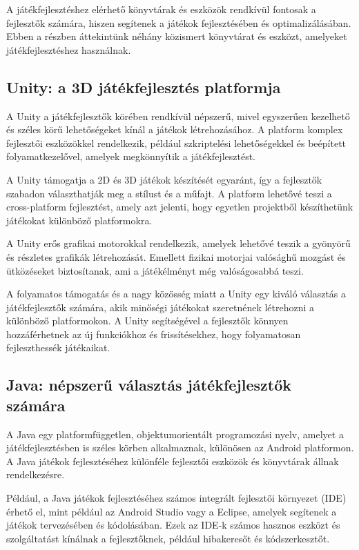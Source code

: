  A játékfejlesztéshez elérhető könyvtárak és eszközök rendkívül fontosak a fejlesztők számára, hiszen segítenek a játékok fejlesztésében és optimalizálásában. Ebben a részben áttekintünk néhány közismert könyvtárat és eszközt, amelyeket játékfejlesztéshez használnak.

\bigskip

\subsection{Unity: a 3D játékfejlesztés platformja}

A Unity\cite{unity-docs, unity-web} a játékfejlesztők körében rendkívül népszerű, mivel egyszerűen kezelhető és széles körű lehetőségeket kínál a játékok létrehozásához. A platform komplex fejlesztői eszközökkel rendelkezik, például szkriptelési lehetőségekkel és beépített folyamatkezelővel, amelyek megkönnyítik a játékfejlesztést. 

A Unity támogatja a 2D és 3D játékok készítését egyaránt, így a fejlesztők szabadon választhatják meg a stílust és a műfajt. A platform lehetővé teszi a cross-platform fejlesztést, amely azt jelenti, hogy egyetlen projektből készíthetünk játékokat különböző platformokra.

A Unity erős grafikai motorokkal rendelkezik, amelyek lehetővé teszik a gyönyörű és részletes grafikák létrehozását. Emellett fizikai motorjai valósághű mozgást és ütközéseket biztosítanak, ami a játékélményt még valóságosabbá teszi.

A folyamatos támogatás és a nagy közösség miatt a Unity egy kiváló választás a játékfejlesztők számára, akik minőségi játékokat szeretnének létrehozni a különböző platformokon. A Unity segítségével a fejlesztők könnyen hozzáférhetnek az új funkciókhoz és frissítésekhez, hogy folyamatosan fejleszthessék játékaikat.
\subsection{Java: népszerű választás játékfejlesztők számára}
 A Java\cite{java-doc, java} egy platformfüggetlen, objektumorientált programozási nyelv, amelyet a játékfejlesztésben is széles körben alkalmaznak, különösen az Android platformon. A Java játékok fejlesztéséhez különféle fejlesztői eszközök és könyvtárak állnak rendelkezésre.

Például, a Java játékok fejlesztéséhez számos integrált fejlesztői környezet (IDE) érhető el, mint például az Android Studio vagy a Eclipse, amelyek segítenek a játékok tervezésében és kódolásában. Ezek az IDE-k számos hasznos eszközt és szolgáltatást kínálnak a fejlesztőknek, például hibakeresőt és kódszerkesztőt.

